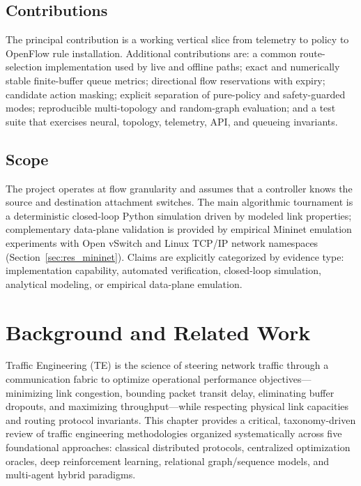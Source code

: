 \documentclass[12pt,a4paper,oneside]{report}
\begin{document}
\section{Contributions}
The principal contribution is a working vertical slice from telemetry to policy to OpenFlow rule installation. Additional contributions are: a common route-selection implementation used by live and offline paths; exact and numerically stable finite-buffer queue metrics; directional flow reservations with expiry; candidate action masking; explicit separation of pure-policy and safety-guarded modes; reproducible multi-topology and random-graph evaluation; and a test suite that exercises neural, topology, telemetry, API, and queueing invariants.

\section{Scope}
The project operates at flow granularity and assumes that a controller knows the source and destination attachment switches. The main algorithmic tournament is a deterministic closed-loop Python simulation driven by modeled link properties; complementary data-plane validation is provided by empirical Mininet emulation experiments with Open vSwitch and Linux TCP/IP network namespaces (Section~\ref{sec:res_mininet}). Claims are explicitly categorized by evidence type: implementation capability, automated verification, closed-loop simulation, analytical modeling, or empirical data-plane emulation.

\chapter{Background and Related Work}
\label{chap:background}

Traffic Engineering (TE) is the science of steering network traffic through a communication fabric to optimize operational performance objectives---minimizing link congestion, bounding packet transit delay, eliminating buffer dropouts, and maximizing throughput---while respecting physical link capacities and routing protocol invariants. This chapter provides a critical, taxonomy-driven review of traffic engineering methodologies organized systematically across five foundational approaches: classical distributed protocols, centralized optimization oracles, deep reinforcement learning, relational graph/sequence models, and multi-agent hybrid paradigms.
\end{document}
